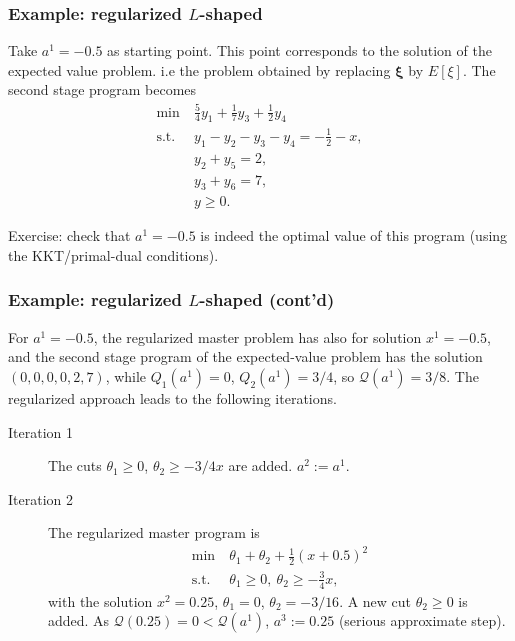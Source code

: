 \documentclass{beamer}
\def\bxi{\boldsymbol\xi}
\begin{document}
\begin{frame}
\frametitle{Example: regularized $L$-shaped}

Take $a^1 = -0.5$ as starting point.
This point corresponds to the solution of the expected value problem. i.e the problem obtained by replacing $\bxi$ by $E[\xi]$.
The second stage program becomes
\begin{align*}
\min\ & \frac{5}{4}y_1 + \frac{1}{7}y_3 + \frac{1}{2}y_4\\
\mbox{s.t. } & y_1 - y_2 - y_3 - y_4 = -\frac{1}{2}-x, \\
& y_2+y_5 = 2, \\
& y_3+y_6 = 7, \\
& y \geq 0.
\end{align*}

\mbox{}

\mbox{}

{\blue Exercise}: check that $a^1 = -0.5$ is indeed the optimal value of this program (using the KKT/primal-dual conditions).
\end{frame}

\begin{frame}
\frametitle{Example: regularized $L$-shaped (cont'd)}

For $a^1 = -0.5$, the regularized master problem has also for solution $x^1 = -0.5$, and the second stage program of the expected-value problem has the solution $(0,0,0,0,2,7)$, while $Q_1(a^1) = 0$, $Q_2(a^1) = 3/4$, so $\mathcal{Q}(a^1) = 3/8$.
The regularized approach leads to the following iterations.
\begin{description}
\item[Iteration 1] The cuts $\theta_1 \geq 0$, $\theta_2 \geq -3/4
x$ are added. $a^2:= a^1$.
\item[Iteration 2]
The regularized master program is
\begin{align*}
\min\ & \theta_1 + \theta_2 + \frac{1}{2}(x+0.5)^2 \\
\mbox{s.t. } & \theta_1 \geq 0,\ \theta_2 \geq -\frac{3}{4}x,
\end{align*}
with the solution $x^2 = 0.25$, $\theta_1 = 0$, $\theta_2 = -3/16$.
A new cut $\theta_2 \geq 0$ is added.
As $\mathcal{Q}(0.25) = 0 < \mathcal{Q}(a^1)$, $a^3 := 0.25$ (serious approximate step).
\end{description}
\end{frame}
\end{document}
